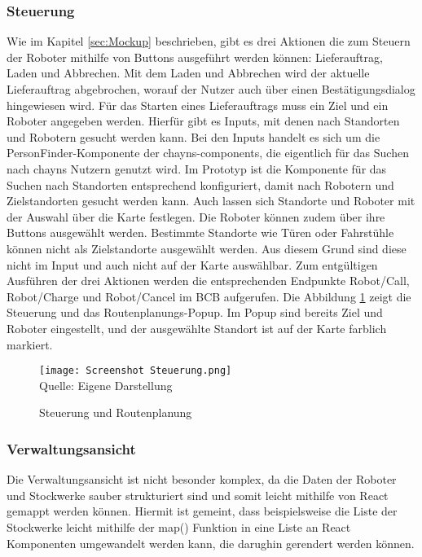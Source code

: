 \subsubsection{Steuerung}
Wie im Kapitel \ref{sec:Mockup} beschrieben, gibt es drei Aktionen die zum Steuern der Roboter mithilfe von Buttons ausgeführt werden können: Lieferauftrag, Laden und Abbrechen. Mit dem Laden und Abbrechen wird der aktuelle Lieferauftrag abgebrochen, worauf der Nutzer auch über einen Bestätigungsdialog hingewiesen wird. Für das Starten eines Lieferauftrags muss ein Ziel und ein Roboter angegeben werden. Hierfür gibt es Inputs, mit denen nach Standorten und Robotern gesucht werden kann. Bei den Inputs handelt es sich um die PersonFinder-Komponente \cite{ChaynsPersonFinder} der chayns-components, die eigentlich für das Suchen nach chayns Nutzern genutzt wird. Im Prototyp ist die Komponente für das Suchen nach Standorten entsprechend konfiguriert, damit nach Robotern und Zielstandorten gesucht werden kann. Auch lassen sich Standorte und Roboter mit der Auswahl über die Karte festlegen. Die Roboter können zudem über ihre Buttons ausgewählt werden. Bestimmte Standorte wie Türen oder Fahrstühle können nicht als Zielstandorte ausgewählt werden. Aus diesem Grund sind diese nicht im Input und auch nicht auf der Karte auswählbar. Zum entgültigen Ausführen der drei Aktionen werden die entsprechenden Endpunkte Robot/Call, Robot/Charge und Robot/Cancel im \ac{BCB} \cite{BCBSwagger} aufgerufen. Die Abbildung \ref{fig:ControlsScreenshot} zeigt die Steuerung und das Routenplanungs-Popup. Im Popup sind bereits Ziel und Roboter eingestellt, und der ausgewählte Standort ist auf der Karte farblich markiert.

\begin{figure}[H]
    \caption{Steuerung und Routenplanung}\label{fig:ControlsScreenshot}
    \texttt{[image: Screenshot Steuerung.png]}
    \\
    Quelle: Eigene Darstellung
\end{figure}

\subsubsection{Verwaltungsansicht}
Die Verwaltungsansicht ist nicht besonder komplex, da die Daten der Roboter und Stockwerke sauber strukturiert sind und somit leicht mithilfe von React gemappt werden können. Hiermit ist gemeint, dass beispielsweise die Liste der Stockwerke leicht mithilfe der map() Funktion in eine Liste an React Komponenten umgewandelt werden kann, die darughin gerendert werden können\cite{ReactMapping}.

